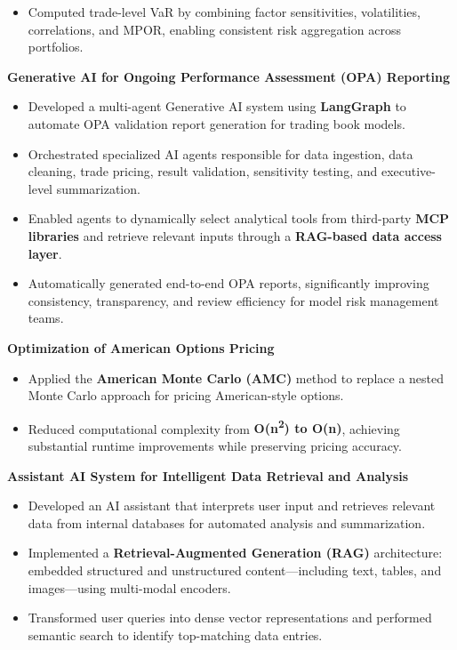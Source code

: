 \begin{cventries}
{\begin{cvitems}
\begin{itemize}
      \item Computed trade-level VaR by combining factor sensitivities, volatilities, correlations, and {MPOR}, enabling consistent risk aggregation across portfolios.
    \end{itemize}
    \item \textbf{Generative AI for Ongoing Performance Assessment (OPA) Reporting}
    \begin{itemize}
      \item Developed a {multi-agent Generative AI system} using \textbf{LangGraph} to automate OPA validation report generation for trading book models.
      \item Orchestrated specialized AI agents responsible for data ingestion, data cleaning, trade pricing, result validation, sensitivity testing, and executive-level summarization.
      \item Enabled agents to dynamically select analytical tools from third-party \textbf{MCP libraries} and retrieve relevant inputs through a \textbf{RAG-based data access layer}.
      \item Automatically generated end-to-end OPA reports, significantly improving consistency, transparency, and review efficiency for model risk management teams.
    \end{itemize}
    \item \textbf{Optimization of American Options Pricing}
    \begin{itemize}
      \item Applied the \textbf{American Monte Carlo (AMC)} method to replace a nested Monte Carlo approach for pricing American-style options.
      \item Reduced computational complexity from \textbf{O(n\textsuperscript{2}) to O(n)}, achieving substantial runtime improvements while preserving pricing accuracy.
    \end{itemize}
    \item \textbf{Assistant AI System for Intelligent Data Retrieval and Analysis}
    \begin{itemize}
      \item Developed an AI assistant that interprets user input and retrieves relevant data from internal databases for automated analysis and summarization.
      \item Implemented a \textbf{Retrieval-Augmented Generation (RAG)} architecture: embedded structured and unstructured content—including text, tables, and images—using multi-modal encoders.
      \item Transformed user queries into dense vector representations and performed semantic search to identify top-matching data entries.

\end{itemize}
\end{cvitems}}
\end{cventries}
